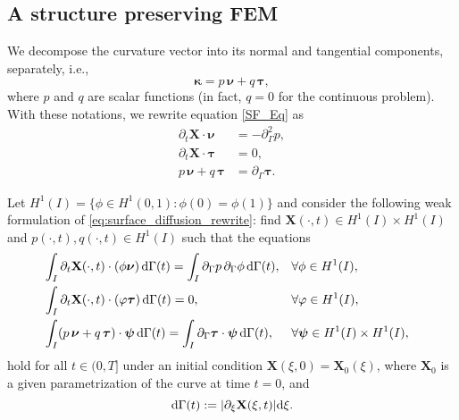 \documentclass[review]{elsarticle}
\def\d{{\mathrm d}}
\begin{document}

\subsection{A structure preserving FEM}\label{section:I}

We decompose the curvature vector into its normal and tangential components, separately, i.e.,
$$
\boldsymbol\kappa= p\,\boldsymbol\nu + q\,\boldsymbol\tau,
$$
where $p$ and $q$ are scalar functions (in fact, $q=0$ for the continuous problem).
With these notations, we rewrite equation \eqref{SF_Eq} as
\begin{subequations}\label{eq:surface_diffusion_rewrite}
\begin{align}
\partial_t\mathbf{X} \cdot \boldsymbol \nu &= - \partial_{\Gamma}^2 p,\\
  \partial_t\mathbf{X} \cdot \boldsymbol \tau &= 0,\\
  p\,\boldsymbol\nu + q\,\boldsymbol\tau &= \partial_{\Gamma} \boldsymbol\tau .
\end{align}
\end{subequations}

Let $H^1(I)=\{\phi \in H^1(0,1): \phi(0) = \phi(1)\}$ and consider the following weak formulation of \eqref{eq:surface_diffusion_rewrite}:
find $\mathbf{X}(\cdot, t)\in H^1(I)\times H^1(I)$ and $p(\cdot, t),q(\cdot, t)\in H^1(I)$ such that the equations
\begin{subequations}\label{eq:variation_formulation_conti}
\begin{align}
&\hspace{-10pt} \int_{I} \partial_t\mathbf{X}(\cdot,t) \cdot (\phi\boldsymbol\nu) \, \mathrm{d}\Gamma(t) = \int_{I} \partial_\Gamma p\, \partial_\Gamma \phi \,\mathrm{d}\Gamma(t), &&\forall\phi\in H^1(I), \\
&\hspace{-10pt} \int_{I} \partial_t \mathbf{X}(\cdot,t) \cdot (\varphi\boldsymbol\tau) \, \mathrm{d}\Gamma(t) = 0, && \forall\varphi\in H^1(I),\\
&\hspace{-10pt} \int_{I} (p\,\boldsymbol\nu + q\,\boldsymbol\tau) \cdot \boldsymbol\psi \,\mathrm{d}\Gamma(t) = \int_{I} \partial_\Gamma \boldsymbol{\tau} \cdot \boldsymbol\psi \,\mathrm{d} \Gamma(t), && \forall\boldsymbol\psi\in H^1(I)\times H^1(I) ,
\end{align}
\end{subequations}
hold for all $t\in(0,T]$ under an initial condition $\mathbf{X}(\xi, 0)=\mathbf{X}_0(\xi)$, where $\mathbf{X}_0$ is a given parametrization of the curve at time $t=0$, and
$$\d\Gamma(t):=|\partial_\xi {\bf X}(\xi,t)|\d\xi .$$
\end{document}
